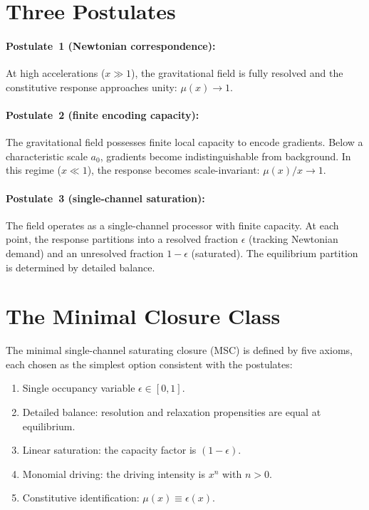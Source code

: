 \documentclass[twocolumn]{iopjournal}
\begin{document}

\section*{Three Postulates}

\paragraph{Postulate~1 (Newtonian correspondence):}
At high accelerations ($x \gg 1$), the gravitational field is fully
resolved and the constitutive response approaches unity:
$\mu(x) \to 1$.

\paragraph{Postulate~2 (finite encoding capacity):}
The gravitational field possesses finite local capacity to encode
gradients. Below a characteristic scale $a_0$, gradients become
indistinguishable from background. In this regime ($x \ll 1$), the
response becomes scale-invariant: $\mu(x)/x \to 1$.

\paragraph{Postulate~3 (single-channel saturation):}
The field operates as a single-channel processor with finite
capacity. At each point, the response partitions into a resolved
fraction $\epsilon$ (tracking Newtonian demand) and an unresolved
fraction $1 - \epsilon$ (saturated). The equilibrium partition is
determined by detailed balance.


\section*{The Minimal Closure Class}

The minimal single-channel saturating closure (MSC) is defined by
five axioms, each chosen as the simplest option consistent with
the postulates:

\begin{enumerate}
\item Single occupancy variable $\epsilon \in [0,1]$.
\item Detailed balance: resolution and relaxation propensities
  are equal at equilibrium.
\item Linear saturation: the capacity factor is $(1 - \epsilon)$.
\item Monomial driving: the driving intensity is $x^n$ with
  $n > 0$.
\item Constitutive identification: $\mu(x) \equiv \epsilon(x)$.
\end{enumerate}
\end{document}
